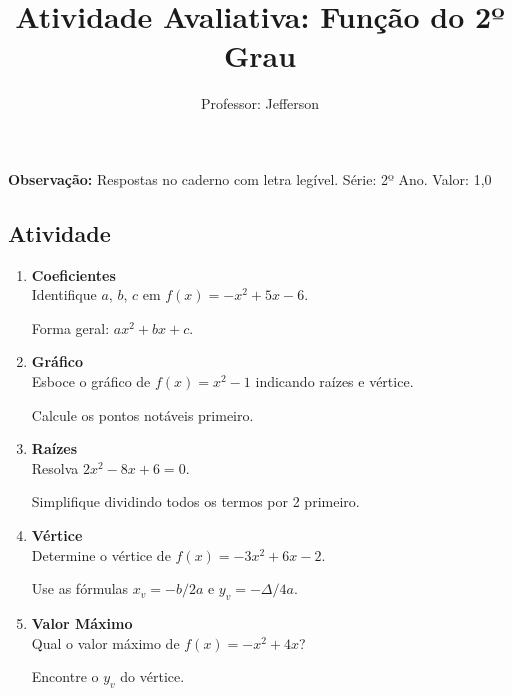 \documentclass[11pt]{article}
\title{\textcolor{titleblue}{Atividade Avaliativa: Função do 2º Grau}}
\author{Professor: Jefferson}
\date{}
\begin{document}
\maketitle
\vspace{-1cm}

\begin{center}
    \large{\textbf{Observação:} Respostas no caderno com letra legível. \quad Série: 2º Ano. Valor: 1,0}
\end{center}

\begin{multicols}{2}

\section*{Atividade}
\begin{enumerate}

\item \textbf{Coeficientes}\\
Identifique $a$, $b$, $c$ em $f(x) = -x^2 + 5x - 6$.
\begin{tcolorbox}[colback=explanationbg,colframe=titleblue,title=Dica:]
Forma geral: $ax^2 + bx + c$.
\end{tcolorbox}

\item \textbf{Gráfico}\\
Esboce o gráfico de $f(x) = x^2 - 1$ indicando raízes e vértice.
\begin{tcolorbox}[colback=explanationbg,colframe=titleblue,title=Dica:]
Calcule os pontos notáveis primeiro.
\end{tcolorbox}

\item \textbf{Raízes}\\
Resolva $2x^2 - 8x + 6 = 0$.
\begin{tcolorbox}[colback=explanationbg,colframe=titleblue,title=Dica:]
Simplifique dividindo todos os termos por 2 primeiro.
\end{tcolorbox}

\item \textbf{Vértice}\\
Determine o vértice de $f(x) = -3x^2 + 6x - 2$.
\begin{tcolorbox}[colback=explanationbg,colframe=titleblue,title=Dica:]
Use as fórmulas $x_v = -b/2a$ e $y_v = -\Delta/4a$.
\end{tcolorbox}

\item \textbf{Valor Máximo}\\
Qual o valor máximo de $f(x) = -x^2 + 4x$?
\begin{tcolorbox}[colback=explanationbg,colframe=titleblue,title=Dica:]
Encontre o $y_v$ do vértice.
\end{tcolorbox}


\end{enumerate}
\end{multicols}
\end{document}
